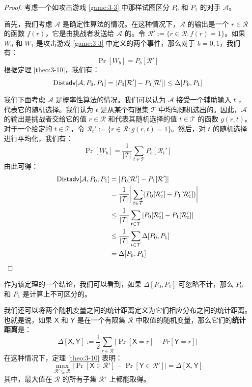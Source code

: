 \begin{proof}
考虑一个如攻击游戏 \ref{game:3-3} 中那样试图区分 $P_0$ 和 $P_1$ 的对手 $\mathcal A$。

首先，我们考虑 $\mathcal A$ 是确定性算法的情况。在这种情况下，$\mathcal A$ 的输出是一个 $r\in\mathcal{R}$ 的函数 $f(r)$，它是由挑战者发送给 $\mathcal A$ 的。令 $\mathcal{R}':=\{r\in\mathcal{R}:f(r)=1\}$。如果 $W_0$ 和 $W_1$ 是攻击游戏 \ref{game:3-3} 中定义的两个事件，那么对于 $b=0,1$，我们有：
\[
\Pr[W_b]=P_b[\mathcal{R}']
\]
根据定理 \ref{theo:3-10}，我们有：
\[
{\rm Dist\mathsf{adv}}[\mathcal{A},P_0,P_1]=|P_0[\mathcal{R}']-P_1[\mathcal{R}']|\leq\Delta[P_0, P_1]
\]

我们下面考虑 $\mathcal A$ 是概率性算法的情况。我们可以认为 $\mathcal A$ 接受一个辅助输入 $t$ ，代表它的随机选择。我们认为 $t$ 是从某个有限集 $\mathcal{T}$ 中均匀随机选出的。因此，$\mathcal A$ 的输出是挑战者交给它的值 $r\in\mathcal{R}$ 和代表其随机选择的值 $t\in\mathcal{T}$ 的函数 $g(r,t)$。对于一个给定的 $t\in\mathcal{T}$，令 $\mathcal{R}_t':=\{r\in\mathcal{R}:g(r,t)=1\}$。然后，对 $t$ 的随机选择进行平均化，我们有：
\[
\Pr[W_b]=\frac{1}{|\mathcal{T}|}\sum_{t\in\mathcal{T}}P_b[\mathcal{R}_t']
\]
由此可得：
\[
\begin{aligned}
{\rm Dist\mathsf{adv}}[\mathcal{A},P_0,P_1]
&=|P_0[\mathcal{R}']-P_1[\mathcal{R}']|\\
&=\frac{1}{|\mathcal{T}|}\bigg\lvert\sum_{t\in\mathcal{T}}(P_0[\mathcal{R}_t']-P_1[\mathcal{R}_t'])\bigg\rvert\\
&\leq\frac{1}{|\mathcal{T}|}\sum_{t\in\mathcal{T}}|P_0[\mathcal{R}_t']-P_1[\mathcal{R}_t']|\\
&\leq\frac{1}{|\mathcal{T}|}\sum_{t\in\mathcal{T}}\Delta[P_0,P_1]\\
&=\Delta[P_0,P_1]\qedhere
\end{aligned}
\]
\end{proof}

作为该定理的一个结论，我们可以看到，如果 $\Delta[P_0,P_1]$ 可忽略不计，那么 $P_0$ 和 $P_1$ 是计算上不可区分的。

\vspace{5pt}

我们还可以将两个随机变量之间的统计距离定义为它们相应分布之间的统计距离。也就是说，如果 $\mathsf{X}$ 和 $\mathsf{Y}$ 是在一个有限集 $\mathcal{R}$ 中取值的随机变量，那么它们的\textbf{统计距离}是：
\[
\Delta[\mathsf{X},\mathsf{Y}]
:=
\frac{1}{2}
\sum_{r\in\mathcal{R}}
|\Pr[\mathsf{X}=r]-Pr[\mathsf{Y}=r]|
\]
在这种情况下，定理 \ref{theo:3-10} 表明：
\[
\max_{\mathcal{R}'\subseteq\mathcal{R}}
|\Pr[\mathsf{X}\in\mathcal{R}']-\Pr[\mathsf{Y}\in\mathcal{R}']|=\Delta[\mathsf{X},\mathsf{Y}]
\]
其中，最大值在 $\mathcal R$ 的所有子集 $\mathcal R'$ 上都能取得。

